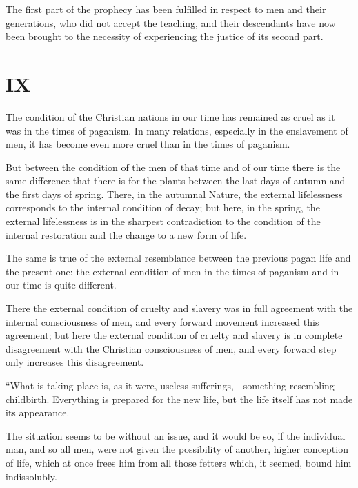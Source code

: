\documentclass{book}
\begin{document}
The first part of the prophecy has been fulfilled in respect to men and their generations, who did not accept the teaching, and their descendants have now been brought to the necessity of experiencing the justice of its second part.

\chapter*{IX}
\label{chapter-9}
The condition of the Christian nations in our time has remained as cruel as it was in the times of paganism. In many relations, especially in the enslavement of men, it has become even more cruel than in the times of paganism.

But between the condition of the men of that time and of our time there is the same difference that there is for the plants between the last days of autumn and the first days of spring. There, in the autumnal Nature, the external lifelessness corresponds to the internal condition of decay; but here, in the spring, the external lifelessness is in the sharpest contradiction to the condition of the internal restoration and the change to a new form of life.

The same is true of the external resemblance between the previous pagan life and the present one: the external condition of men in the times of paganism and in our time is quite different.

There the external condition of cruelty and slavery was in full agreement with the internal consciousness of men, and every forward movement increased this agreement; but here the external condition of cruelty and slavery is in complete disagreement with the Christian consciousness of men, and every forward step only increases this disagreement.

“What is taking place is, as it were, useless sufferings,—something resembling childbirth. Everything is prepared for the new life, but the life itself has not made its appearance.

The situation seems to be without an issue, and it would be so, if the individual man, and so all men, were not given the possibility of another, higher conception of life, which at once frees him from all those fetters which, it seemed, bound him indissolubly.
\end{document}
